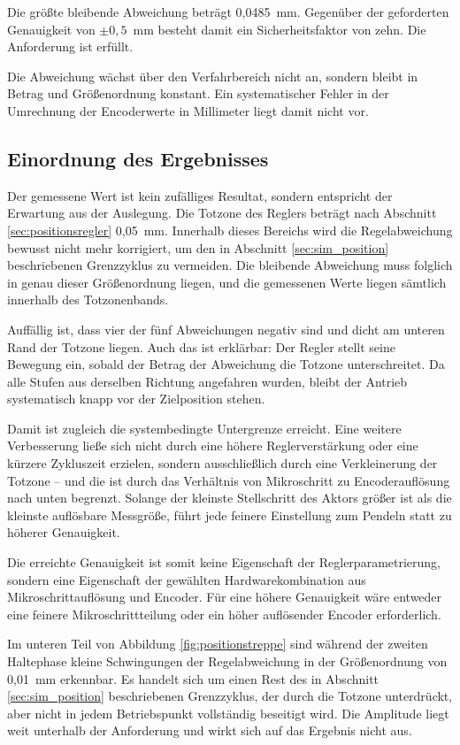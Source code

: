 Die größte bleibende Abweichung beträgt 0,0485~mm. Gegenüber der geforderten Genauigkeit
von $\pm 0{,}5$~mm besteht damit ein Sicherheitsfaktor von zehn. Die Anforderung ist
erfüllt.

Die Abweichung wächst über den Verfahrbereich nicht an, sondern bleibt in Betrag und
Größenordnung konstant. Ein systematischer Fehler in der Umrechnung der Encoderwerte in
Millimeter liegt damit nicht vor.

\subsection*{Einordnung des Ergebnisses}

Der gemessene Wert ist kein zufälliges Resultat, sondern entspricht der Erwartung aus der
Auslegung. Die Totzone des Reglers beträgt nach Abschnitt \ref{sec:positionsregler}
0,05~mm. Innerhalb dieses Bereichs wird die Regelabweichung bewusst nicht mehr korrigiert,
um den in Abschnitt \ref{sec:sim_position} beschriebenen Grenzzyklus zu vermeiden. Die
bleibende Abweichung muss folglich in genau dieser Größenordnung liegen, und die
gemessenen Werte liegen sämtlich innerhalb des Totzonenbands.

Auffällig ist, dass vier der fünf Abweichungen negativ sind und dicht am unteren Rand der
Totzone liegen. Auch das ist erklärbar: Der Regler stellt seine Bewegung ein, sobald der
Betrag der Abweichung die Totzone unterschreitet. Da alle Stufen aus derselben Richtung
angefahren wurden, bleibt der Antrieb systematisch knapp vor der Zielposition stehen.

Damit ist zugleich die systembedingte Untergrenze erreicht. Eine weitere Verbesserung
ließe sich nicht durch eine höhere Reglerverstärkung oder eine kürzere Zykluszeit
erzielen, sondern ausschließlich durch eine Verkleinerung der Totzone -- und die ist durch
das Verhältnis von Mikroschritt zu Encoderauflösung nach unten begrenzt. Solange der
kleinste Stellschritt des Aktors größer ist als die kleinste auflösbare Messgröße, führt
jede feinere Einstellung zum Pendeln statt zu höherer Genauigkeit.

Die erreichte Genauigkeit ist somit keine Eigenschaft der Reglerparametrierung, sondern
eine Eigenschaft der gewählten Hardwarekombination aus Mikroschrittauflösung und Encoder.
Für eine höhere Genauigkeit wäre entweder eine feinere Mikroschrittteilung oder ein höher
auflösender Encoder erforderlich.

Im unteren Teil von Abbildung \ref{fig:positionstreppe} sind während der zweiten Haltephase
kleine Schwingungen der Regelabweichung in der Größenordnung von 0,01~mm erkennbar. Es
handelt sich um einen Rest des in Abschnitt \ref{sec:sim_position} beschriebenen
Grenzzyklus, der durch die Totzone unterdrückt, aber nicht in jedem Betriebspunkt
vollständig beseitigt wird. Die Amplitude liegt weit unterhalb der Anforderung und wirkt
sich auf das Ergebnis nicht aus.


